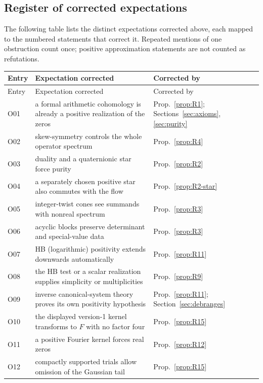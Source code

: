 \documentclass[11pt]{amsart}
\theoremstyle{plain}
\theoremstyle{definition}
\theoremstyle{remark}
\numberwithin{equation}{section}
\begin{document}
\subsection{Register of corrected expectations}
\label{subsec:neg-register}

The following table lists the distinct expectations corrected above,
each mapped to the numbered statements that correct it. Repeated
mentions of one obstruction count once; positive approximation
statements are not counted as refutations.

\begin{longtable}{@{}l>{\raggedright\arraybackslash}p{}
>{\raggedright\arraybackslash}p{}@{}}
\toprule
Entry & Expectation corrected & Corrected by\\
\midrule
\endfirsthead
\toprule
Entry & Expectation corrected & Corrected by\\
\midrule
\endhead
\bottomrule
\endfoot
O01 & a formal arithmetic cohomology is already a positive realization of
  the zeros & Prop.~\ref{prop:R1}; Sections~\ref{sec:axioms},
  \ref{sec:purity}\\
O02 & skew-symmetry controls the whole operator spectrum &
  Prop.~\ref{prop:R4}\\
O03 & duality and a quaternionic star force purity & Prop.~\ref{prop:R2}\\
O04 & a separately chosen positive star also commutes with the flow &
  Prop.~\ref{prop:R2-star}\\
O05 & integer-twist cones see summands with nonreal spectrum &
  Prop.~\ref{prop:R3}\\
O06 & acyclic blocks preserve determinant and special-value data &
  Prop.~\ref{prop:R3}\\
O07 & HB (logarithmic) positivity extends downwards automatically &
  Prop.~\ref{prop:R11}\\
O08 & the HB test or a scalar realization supplies simplicity or
  multiplicities & Prop.~\ref{prop:R9}\\
O09 & inverse canonical-system theory proves its own positivity
  hypothesis & Prop.~\ref{prop:R11}; Section~\ref{sec:debranges}\\
O10 & the displayed version-1 kernel transforms to $F$ with no factor
  four & Prop.~\ref{prop:R15}\\
O11 & a positive Fourier kernel forces real zeros & Prop.~\ref{prop:R12}\\
O12 & compactly supported trials allow omission of the Gaussian tail &
  Prop.~\ref{prop:R15}\\

\end{longtable}
\end{document}
